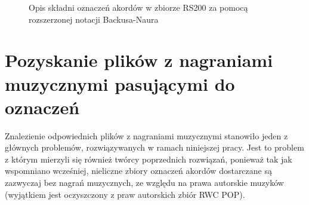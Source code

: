 \begin{figure}
    \centering
    \caption{Opis składni oznaczeń akordów w zbiorze RS200 za pomocą rozszerzonej notacji Backusa-Naura}
    \label{fig:rs200_dt_syntax}
    {\scriptsize }
\end{figure}


\section{Pozyskanie plików z nagraniami muzycznymi pasującymi do oznaczeń}

Znalezienie odpowiednich plików z nagraniami muzycznymi stanowiło jeden z głównych problemów,
rozwiązywanych w ramach niniejszej pracy. Jest to problem z którym mierzyli się również twórcy
poprzednich rozwiązań, ponieważ tak jak wspomniano wcześniej, nieliczne zbiory oznaczeń
akordów dostarczane są zazwyczaj bez nagrań muzycznych, ze względu na prawa autorskie muzyków
(wyjątkiem jest oczyszczony z praw autorskich zbiór RWC POP).

